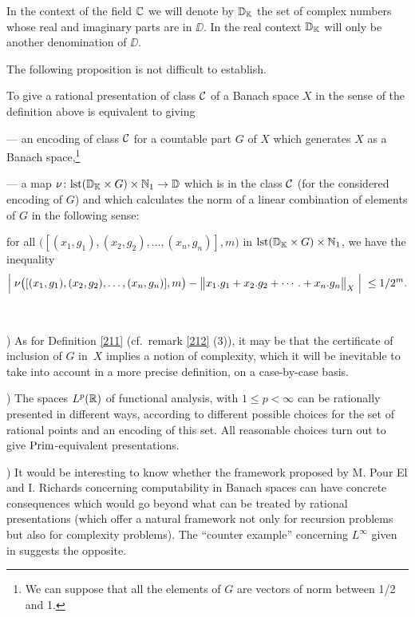 In the context of the field $\mathbb {C}$ we will denote by $\mathbb {D}_\mathbb {K}$ the set of complex numbers whose real and imaginary parts are in $\DD$. In the real context $\mathbb {D}_\mathbb {K}$ will only be another denomination of $\DD$.

\noindent 
The following proposition is not difficult to establish. 

\begin{proposition} \label{262}
To give a rational presentation of class ${{\cal C}}$ of a Banach space $X$ in the sense of the definition above is equivalent to giving  

\noindent 
--- an encoding of class ${{\cal C}}$ for a countable part $G$ of $X$ which generates $X$ as a Banach space,\footnote{We can suppose that all the elements of $G$ are vectors of norm between 1/2 and 1.}

\noindent 
--- a map $\nu\colon {\rm lst}(\mathbb {D}_{\mathbb {K}} \times G) \times \mathbb {N}_1 \to \mathbb {D}$ which is in the class ${{\cal C}}$ (for the considered encoding of $G$) and which calculates the norm of a linear combination of elements of $G$ in the following sense:

\noindent 	
for all $\big([(x_1,g_1),(x_2,g_2),\ldots,(x_n,g_n)],m\big)$ in ${\rm lst}(\mathbb {D}_{\mathbb {K}} \times G) \times \mathbb {N}_1$, we have the inequality
\[
\Big|{\;\nu\big([(x_1,g_1),(x_2,g_2),\ldots,(x_n,g_n)],m\big) - \big\lVert  x_1.g_1 + x_2.g_2 +\cdots.+ x_n.g_n  \big\rVert_X \; }\Big|\; \leq 1/2^m.
\]
\end{proposition}

\begin{remarks}\label{263}~

) As for Definition \ref{211} (cf.\ remark \ref{212} (3)), it may be that the certificate of inclusion of $G$ in~$X$ implies a notion of complexity, which it will be inevitable to take into account in a more precise definition, on a case-by-case basis.

) The spaces $L^p(\mathbb {R})$ of functional analysis, with $1 \leq p < \infty$ can be rationally presented in different ways, according to different possible choices for the set of rational points and an encoding of this set. All reasonable choices turn out to give ${\rm Prim}$-equivalent presentations. 

) It would be interesting to know whether the framework proposed by M. Pour El and I. Richards \cite{PR} concerning computability in Banach spaces can have concrete consequences which would go beyond what can be treated by rational presentations (which offer a natural framework not only for recursion problems but also for complexity problems). The ``counter example'' concerning $L^\infty$ given in \cite{PR} suggests the opposite. 
\end{remarks}

